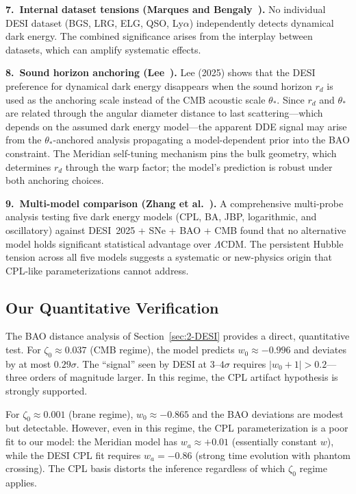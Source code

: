 \textbf{7.\ Internal dataset tensions (Marques and Bengaly~\cite{ch2:Marques2025}).} No individual DESI dataset (BGS, LRG, ELG, QSO, Ly$\alpha$) independently detects dynamical dark energy. The combined significance arises from the interplay between datasets, which can amplify systematic effects.

\textbf{8.\ Sound horizon anchoring (Lee~\cite{ch2:Lee2025}).} Lee (2025) shows that the DESI preference for dynamical dark energy disappears when the sound horizon $r_d$ is used as the anchoring scale instead of the CMB acoustic scale $\theta_*$. Since $r_d$ and $\theta_*$ are related through the angular diameter distance to last scattering---which depends on the assumed dark energy model---the apparent DDE signal may arise from the $\theta_*$-anchored analysis propagating a model-dependent prior into the BAO constraint. The Meridian self-tuning mechanism pins the bulk geometry, which determines $r_d$ through the warp factor; the model's prediction is robust under both anchoring choices.

\textbf{9.\ Multi-model comparison (Zhang et al.~\cite{ch2:Zhang2026}).} A comprehensive multi-probe analysis testing five dark energy models (CPL, BA, JBP, logarithmic, and oscillatory) against DESI~2025 + SNe + BAO + CMB found that no alternative model holds significant statistical advantage over $\Lambda$CDM. The persistent Hubble tension across all five models suggests a systematic or new-physics origin that CPL-like parameterizations cannot address.

\subsection{Our Quantitative Verification}
\label{sec:2-CPL-quant}

The BAO distance analysis of Section~\ref{sec:2-DESI} provides a direct, quantitative test. For $\zeta_0 \approx 0.037$ (CMB regime), the model predicts $w_0 \approx -0.996$ and deviates by at most $0.29\sigma$. The ``signal'' seen by DESI at $3$--$4\sigma$ requires $|w_0 + 1| > 0.2$---three orders of magnitude larger. In this regime, the CPL artifact hypothesis is strongly supported.

For $\zeta_0 \approx 0.001$ (brane regime), $w_0 \approx -0.865$ and the BAO deviations are modest but detectable. However, even in this regime, the CPL parameterization is a poor fit to our model: the Meridian model has $w_a \approx +0.01$ (essentially constant $w$), while the DESI CPL fit requires $w_a = -0.86$ (strong time evolution with phantom crossing). The CPL basis distorts the inference regardless of which $\zeta_0$ regime applies.

